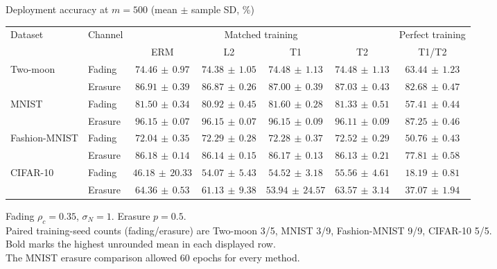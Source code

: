 \documentclass[border=4pt]{standalone}
\begin{document}
\begin{minipage}{7.8in}
\centering
Deployment accuracy at $m=500$ (mean $\pm$ sample SD, \%)\\[4pt]
\begin{tabular*}{\linewidth}{@{\extracolsep{\fill}}llccccc@{}}
\toprule
\multirow{2}{*}{Dataset} & \multirow{2}{*}{Channel} & \multicolumn{4}{c}{Matched training} & Perfect training \\
\cmidrule(lr){3-6}\cmidrule(l){7-7}
 & & ERM & L2 & T1 & T2 & T1/T2 \\
\midrule
\multirow{2}{*}{Two-moon} & Fading & $74.46\,\pm\,0.97$ & $74.38\,\pm\,1.05$ & $74.48\,\pm\,1.13$ & $\mathbf{74.48}\,\pm\,1.13$ & $63.44\,\pm\,1.23$ \\
 & Erasure & $86.91\,\pm\,0.39$ & $86.87\,\pm\,0.26$ & $87.00\,\pm\,0.39$ & $\mathbf{87.03}\,\pm\,0.43$ & $82.68\,\pm\,0.47$ \\
\midrule[0.25pt]
\multirow{2}{*}{MNIST} & Fading & $81.50\,\pm\,0.34$ & $80.92\,\pm\,0.45$ & $\mathbf{81.60}\,\pm\,0.28$ & $81.33\,\pm\,0.51$ & $57.41\,\pm\,0.44$ \\
 & Erasure & $\mathbf{96.15}\,\pm\,0.07$ & $96.15\,\pm\,0.07$ & $96.15\,\pm\,0.09$ & $96.11\,\pm\,0.09$ & $87.25\,\pm\,0.46$ \\
\midrule[0.25pt]
\multirow{2}{*}{Fashion-MNIST} & Fading & $72.04\,\pm\,0.35$ & $72.29\,\pm\,0.28$ & $72.28\,\pm\,0.37$ & $\mathbf{72.52}\,\pm\,0.29$ & $50.76\,\pm\,0.43$ \\
 & Erasure & $\mathbf{86.18}\,\pm\,0.14$ & $86.14\,\pm\,0.15$ & $86.17\,\pm\,0.13$ & $86.13\,\pm\,0.21$ & $77.81\,\pm\,0.58$ \\
\midrule[0.25pt]
\multirow{2}{*}{CIFAR-10} & Fading & $46.18\,\pm\,20.33$ & $54.07\,\pm\,5.43$ & $54.52\,\pm\,3.18$ & $\mathbf{55.56}\,\pm\,4.61$ & $18.19\,\pm\,0.81$ \\
 & Erasure & $\mathbf{64.36}\,\pm\,0.53$ & $61.13\,\pm\,9.38$ & $53.94\,\pm\,24.57$ & $63.57\,\pm\,3.14$ & $37.07\,\pm\,1.94$ \\
\bottomrule
\end{tabular*}
\par\smallskip\raggedright\footnotesize
Fading $\rho_c=0.35$, $\sigma_N=1$. Erasure $p=0.5$.\\
Paired training-seed counts (fading/erasure) are Two-moon 3/5, MNIST 3/9, Fashion-MNIST 9/9, CIFAR-10 5/5.\\
Bold marks the highest unrounded mean in each displayed row.\\
The MNIST erasure comparison allowed 60 epochs for every method.
\end{minipage}
\end{document}

